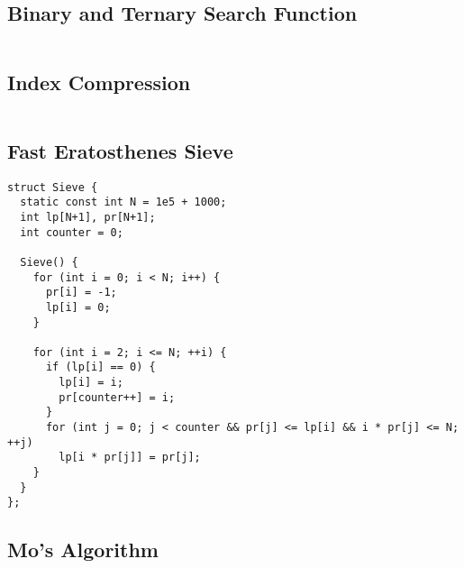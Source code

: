 \subsection{Binary and Ternary Search Function}

\hrulefill \vspace{-\baselineskip}
\inputminted[autogobble,fontsize=\footnotesize]{C++}{Algorithms/ternary.cpp}
\vspace{-\baselineskip}
\noindent \hrulefill

\subsection{Index Compression}

\hrulefill \vspace{-\baselineskip}
\inputminted[autogobble,fontsize=\footnotesize]{C++}{Algorithms/index_compression.cpp}
\vspace{-\baselineskip}
\noindent \hrulefill

\subsection{Fast Eratosthenes Sieve}

\begin{lstlisting}
struct Sieve {
  static const int N = 1e5 + 1000;
  int lp[N+1], pr[N+1];
  int counter = 0;

  Sieve() {
    for (int i = 0; i < N; i++) {
      pr[i] = -1;
      lp[i] = 0;
    }
    
    for (int i = 2; i <= N; ++i) {
      if (lp[i] == 0) {
        lp[i] = i;
        pr[counter++] = i;
      }
      for (int j = 0; j < counter && pr[j] <= lp[i] && i * pr[j] <= N; ++j)
        lp[i * pr[j]] = pr[j];
    }
  }
};
\end{lstlisting}

\newpage

\subsection{Mo's Algorithm}

\hrulefill \vspace{-\baselineskip}
\begin{multicols}{2}
\inputminted[autogobble,fontsize=\footnotesize]{C++}{Algorithms/moalgo.cpp}
\end{multicols}
\vspace{-\baselineskip}
\noindent \hrulefill


